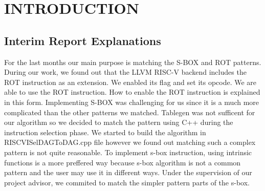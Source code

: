 \chapter{INTRODUCTION}\label{Ch1}


\section{Interim Report Explanations}\label{plan}


For the last months our main purpose is matching the S-BOX and ROT patterns. During our work, we found out that the LLVM RISC-V backend includes the ROT instruction as an extension. We enabled its flag and set its opcode. We are able to use the ROT instruction. How to enable the ROT instruction is explained in this form. Implementing S-BOX was challenging for us since it is a much more complicated than the other patterns we matched. Tablegen was not sufficent for our algorithm so we decided to match the pattern using C++ during the instruction selection phase. We started to build the algorithm in RISCVISelDAGToDAG.cpp file however we found out matching such a complex pattern is not quite reasonable. To implement s-box instruction, using intrinsic functions is a more preffered way because s-box algorithm is not a common pattern and the user may use it in different ways. Under the supervision of our project advisor, we commited to match the simpler pattern parts of the s-box. 
